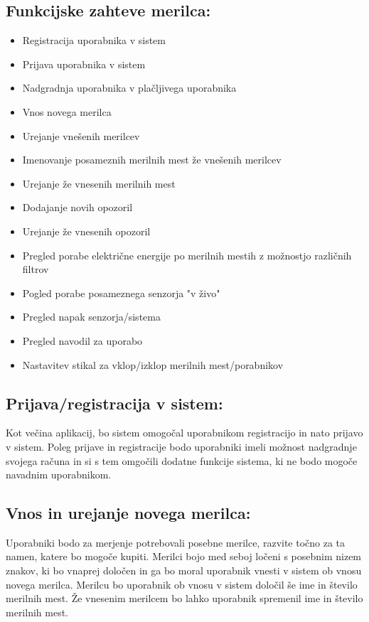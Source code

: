 \documentclass[12pt,a4paper,titlepage,openany]{report}
\begin{document}
\subsection{Funkcijske zahteve merilca:}
\begin{itemize}

\item Registracija uporabnika v sistem
\item Prijava uporabnika v sistem
\item Nadgradnja uporabnika v plačljivega uporabnika
\item Vnos novega merilca
\item Urejanje vnešenih merilcev
\item Imenovanje posameznih merilnih mest že vnešenih merilcev
\item Urejanje že vnesenih merilnih mest
\item Dodajanje novih opozoril
\item Urejanje že vnesenih opozoril
\item Pregled porabe električne energije po merilnih mestih z možnostjo različnih filtrov
\item Pogled porabe posameznega senzorja "v živo"
\item Pregled napak senzorja/sistema
\item Pregled navodil za uporabo
\item Nastavitev stikal za vklop/izklop merilnih mest/porabnikov

\end{itemize}

\subsection{Prijava/registracija v sistem:}
Kot večina aplikacij, bo sistem omogočal uporabnikom registracijo in nato prijavo v sistem. Poleg prijave in registracije bodo uporabniki imeli možnost nadgradnje svojega računa in si s tem omgočili dodatne funkcije sistema, ki ne bodo mogoče navadnim uporabnikom.

\subsection{Vnos in urejanje novega merilca:}
Uporabniki bodo za merjenje potrebovali posebne merilce, razvite točno za ta namen, katere bo mogoče kupiti. Merilci bojo med seboj ločeni s posebnim nizem znakov, ki bo vnaprej določen in ga bo moral uporabnik vnesti v sistem ob vnosu novega merilca. Merilcu bo uporabnik ob vnosu v sistem določil še ime in število merilnih mest. Že vnesenim merilcem bo lahko uporabnik spremenil ime in število merilnih mest.
\end{document}
